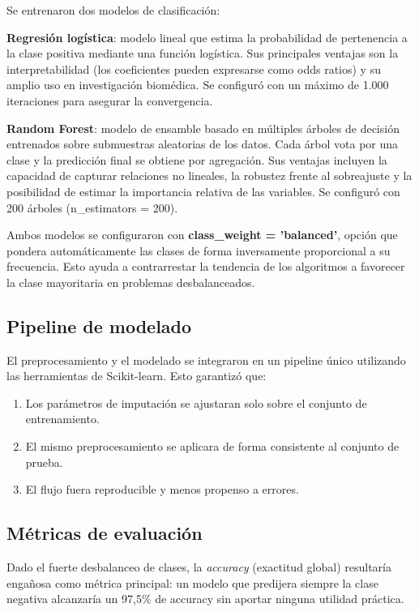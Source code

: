 \documentclass[12pt, a4paper, oneside]{report}
\begin{document}
Se entrenaron dos modelos de clasificación:

\textbf{Regresión logística}: modelo lineal que estima la probabilidad de pertenencia a la clase positiva mediante una función logística. Sus principales ventajas son la interpretabilidad (los coeficientes pueden expresarse como odds ratios) y su amplio uso en investigación biomédica. Se configuró con un máximo de 1.000 iteraciones para asegurar la convergencia.

\textbf{Random Forest}: modelo de ensamble basado en múltiples árboles de decisión entrenados sobre submuestras aleatorias de los datos. Cada árbol vota por una clase y la predicción final se obtiene por agregación. Sus ventajas incluyen la capacidad de capturar relaciones no lineales, la robustez frente al sobreajuste y la posibilidad de estimar la importancia relativa de las variables. Se configuró con 200 árboles (n\_estimators = 200).

Ambos modelos se configuraron con \textbf{class\_weight = 'balanced'}, opción que pondera automáticamente las clases de forma inversamente proporcional a su frecuencia. Esto ayuda a contrarrestar la tendencia de los algoritmos a favorecer la clase mayoritaria en problemas desbalanceados.

\subsection{Pipeline de modelado}

El preprocesamiento y el modelado se integraron en un pipeline único utilizando las herramientas de Scikit-learn. Esto garantizó que:

\begin{enumerate}
    \item Los parámetros de imputación se ajustaran solo sobre el conjunto de entrenamiento.
    \item El mismo preprocesamiento se aplicara de forma consistente al conjunto de prueba.
    \item El flujo fuera reproducible y menos propenso a errores.
\end{enumerate}

\subsection{Métricas de evaluación}

Dado el fuerte desbalanceo de clases, la \textit{accuracy} (exactitud global) resultaría engañosa como métrica principal: un modelo que predijera siempre la clase negativa alcanzaría un 97,5\% de accuracy sin aportar ninguna utilidad práctica.
\end{document}
